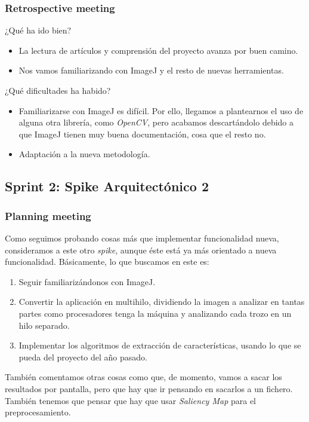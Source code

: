 \subsubsection*{Retrospective meeting}
¿Qué ha ido bien?
\begin{itemize}
 \item La lectura de artículos y comprensión del proyecto avanza por buen camino.
 \item Nos vamos familiarizando con ImageJ y el resto de nuevas herramientas.
\end{itemize}

¿Qué dificultades ha habido?
\begin{itemize}
 \item Familiarizarse con ImageJ es difícil. Por ello, llegamos a plantearnos el uso de alguna otra librería, como \textit{OpenCV}, pero acabamos descartándolo debido a que ImageJ tienen muy buena documentación, cosa que el resto no.
 \item Adaptación a la nueva metodología.
\end{itemize}


\subsection{Sprint 2: Spike Arquitectónico 2}
\subsubsection*{Planning meeting}
Como seguimos probando cosas más que implementar funcionalidad nueva, consideramos a este \sprint{} otro \textit{spike}, aunque éste está ya más orientado a nueva funcionalidad. Básicamente, lo que buscamos en este \sprint{} es:

\begin{enumerate}
\item Seguir familiarizándonos con ImageJ.
\item Convertir la aplicación en multihilo, dividiendo la imagen a analizar en tantas partes como procesadores tenga la máquina y analizando cada trozo en un hilo separado.
\item Implementar los algoritmos de extracción de características, usando lo que se pueda del proyecto del año pasado.
\end{enumerate}

También comentamos otras cosas como que, de momento, vamos a sacar los resultados por pantalla, pero que hay que ir pensando en sacarlos a un fichero. También tenemos que pensar que hay que usar \textit{Saliency Map} para el preprocesamiento.

